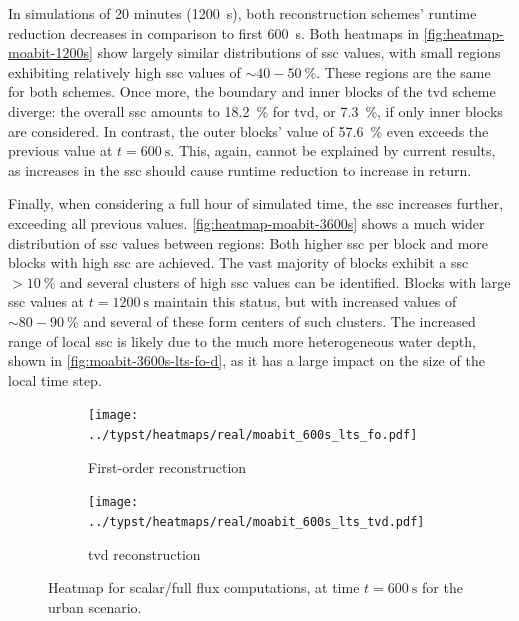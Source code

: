 In simulations of 20 minutes (\SI{1200}{\second}), both reconstruction schemes' runtime reduction decreases in comparison to first \SI{600}{\second}.
Both heatmaps in \autoref{fig:heatmap-moabit-1200s} show largely similar distributions of \gls{ssc} values, with small regions exhibiting relatively high \gls{ssc} values of $\sim\!40-\SI{50}{\percent}$. These regions are the same for both schemes.
Once more, the boundary and inner blocks of the \gls{tvd} scheme diverge: 
the overall \gls{ssc} amounts to \SI{18.2}{\percent} for \gls{tvd}, 
or \SI{7.3}{\percent}, if only inner blocks are considered. In contrast, the outer blocks' value of \SI{57.6}{\percent} even exceeds the previous value at $t=\SI{600}{\second}$.
This, again, cannot be explained by current results, as increases in the \gls{ssc} should cause runtime reduction to increase in return.

Finally, when considering a full hour of simulated time,
the \gls{ssc} increases further, exceeding all previous values. 
\autoref{fig:heatmap-moabit-3600s} shows a much wider distribution of \gls{ssc} values between regions: 
Both higher \gls{ssc} per block and more blocks with high \gls{ssc} are achieved.
The vast majority of blocks exhibit a \gls{ssc} $>\SI{10}{\percent}$ and several clusters of high \gls{ssc} values can be identified.
Blocks with large \gls{ssc} values at $t=\SI{1200}{\second}$ maintain this status, 
but with increased values of $\sim\!80-\SI{90}{\percent}$ and several of these form centers of such clusters.
The increased range of local \gls{ssc} is likely due to the much more heterogeneous water depth, shown in \autoref{fig:moabit-3600s-lts-fo-d}, as it has a large impact on the size of the local time step.

\begin{figure} [hb]
  \centering
  \begin{subfigure}[t]{0.45\textwidth}
    \centering
    \texttt{[image: ../typst/heatmaps/real/moabit\_600s\_lts\_fo.pdf]}
    \caption{
      First-order reconstruction
    }
    \label{fig:heatmap-moabit-600s-fo}
  \end{subfigure}
  \hspace{0.5cm}
  \begin{subfigure}[t]{0.45\textwidth}
    \centering
    \texttt{[image: ../typst/heatmaps/real/moabit\_600s\_lts\_tvd.pdf]}
    \caption{
      \acrshort{tvd} reconstruction
    }
    \label{fig:heatmap-moabit-600s-tvd}

  \end{subfigure}
  \caption{
    Heatmap for scalar/full flux computations, at time $t = \SI{600}{\second}$ for the urban scenario.
    }
  \label{fig:heatmap-moabit-600s}
\end{figure}

